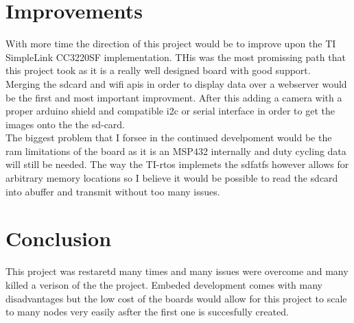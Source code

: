 \documentclass{article}
\begin{document}
\section{Improvements}
With more time the direction of this project would be to improve upon the TI SimpleLink CC3220SF implementation. THis was the most promissing path that this project took as it is a really well designed board with good support. \\
Merging the sdcard and wifi apis in order to display data over a webserver would be the first and most important improvment. After this adding a camera with a proper arduino shield and compatible i2c or serial interface in order to get the images onto the the sd-card.\\
The biggest problem that I forsee in the continued develpoment would be the ram limitations of the board as it is an MSP432 internally and duty cycling data will still be needed. The way the TI-rtos implemets the sdfatfs however allows for arbitrary memory locations so I believe it would be possible to read the sdcard into abuffer and transmit without too many issues.\\


\section{Conclusion}
This project was restaretd many times and many issues were overcome and many killed a verison of the the project. Embeded development comes with many disadvantages but the low cost of the boards would allow for this project to scale to many nodes very easily asfter the first one is succesfully created.
\end{document}
